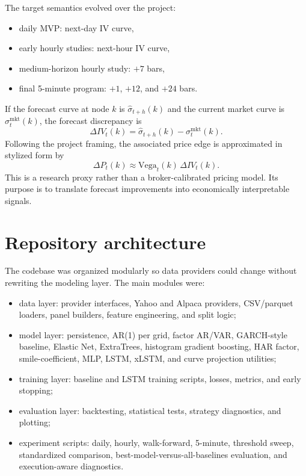 \documentclass[12pt]{report}
\begin{document}
The target semantics evolved over the project:
\begin{itemize}[leftmargin=1.2cm]
    \item daily MVP: next-day IV curve,
    \item early hourly studies: next-hour IV curve,
    \item medium-horizon hourly study: $+7$ bars,
    \item final 5-minute program: $+1$, $+12$, and $+24$ bars.
\end{itemize}

If the forecast curve at node $k$ is $\hat{\sigma}_{t+h}(k)$ and the current market curve is $\sigma_t^{\mathrm{mkt}}(k)$, the forecast discrepancy is
\[
\Delta IV_t(k)=\hat{\sigma}_{t+h}(k)-\sigma_t^{\mathrm{mkt}}(k).
\]
Following the project framing, the associated price edge is approximated in stylized form by
\[
\Delta P_t(k) \approx \mathrm{Vega}_t(k)\,\Delta IV_t(k).
\]
This is a research proxy rather than a broker-calibrated pricing model. Its purpose is to translate forecast improvements into economically interpretable signals.

\section{Repository architecture}
The codebase was organized modularly so data providers could change without rewriting the modeling layer. The main modules were:
\begin{itemize}[leftmargin=1.2cm]
    \item data layer: provider interfaces, Yahoo and Alpaca providers, CSV/parquet loaders, panel builders, feature engineering, and split logic;
    \item model layer: persistence, AR(1) per grid, factor AR/VAR, GARCH-style baseline, Elastic Net, ExtraTrees, histogram gradient boosting, HAR factor, smile-coefficient, MLP, LSTM, xLSTM, and curve projection utilities;
    \item training layer: baseline and LSTM training scripts, losses, metrics, and early stopping;
    \item evaluation layer: backtesting, statistical tests, strategy diagnostics, and plotting;
    \item experiment scripts: daily, hourly, walk-forward, 5-minute, threshold sweep, standardized comparison, best-model-versus-all-baselines evaluation, and execution-aware diagnostics.
\end{itemize}
\end{document}
